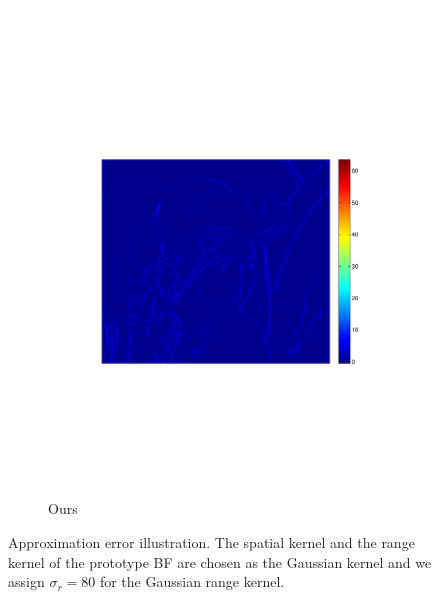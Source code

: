 \documentclass[twocolumn]{el-author}
\begin{document}
\begin{figure}[t]
\begin{subfigure}[b]{0.32\linewidth}
    \includegraphics[width=\linewidth]{5Ours2}
    \caption{Ours}
    \label{fig:minimax_path:path}
\end{subfigure}
\caption{Approximation error illustration.  The spatial kernel and the range kernel of the prototype BF are chosen as the Gaussian kernel and we assign $\sigma_r = 80$ for the Gaussian range kernel.  }
\label{fig:approximation_error}
\vspace{-0.1cm}
\end{figure}
\end{document}
